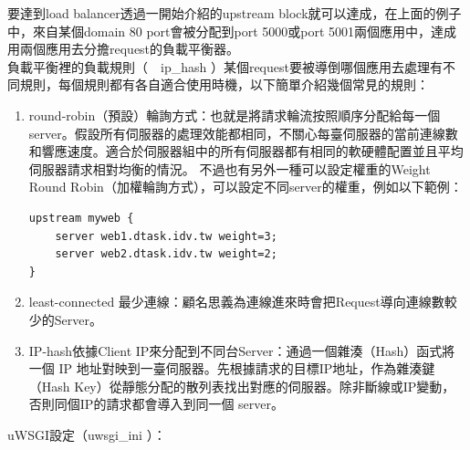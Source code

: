 \documentclass[14pt,a4paper]{report}  %
\begin{document}
 要達到load balancer透過一開始介紹的upstream block就可以達成，在上面的例子中，來自某個domain 80 port會被分配到port 5000或port 5001兩個應用中，達成用兩個應用去分擔request的負載平衡器。\\
 
 負載平衡裡的負載規則（　ip\_hash ）某個request要被導倒哪個應用去處理有不同規則，每個規則都有各自適合使用時機，以下簡單介紹幾個常見的規則：\\

\begin{enumerate}
\item round-robin（預設）輪詢方式：也就是將請求輪流按照順序分配給每一個 server。假設所有伺服器的處理效能都相同，不關心每臺伺服器的當前連線數和響應速度。適合於伺服器組中的所有伺服器都有相同的軟硬體配置並且平均伺服器請求相對均衡的情況。
不過也有另外一種可以設定權重的Weight Round Robin（加權輪詢方式），可以設定不同server的權重，例如以下範例：
\begin{lstlisting}[caption=設定不同 server 的權重]
  upstream myweb {
    server web1.dtask.idv.tw weight=3;
    server web2.dtask.idv.tw weight=2;
}
\end{lstlisting}
\item least-connected 最少連線：顧名思義為連線進來時會把Request導向連線數較少的Server。
\item IP-hash依據Client IP來分配到不同台Server：通過一個雜湊（Hash）函式將一個 IP 地址對映到一臺伺服器。先根據請求的目標IP地址，作為雜湊鍵（Hash Key）從靜態分配的散列表找出對應的伺服器。除非斷線或IP變動，否則同個IP的請求都會導入到同一個 server。
\end{enumerate}
  uWSGI設定（uwsgi\_ini ）：\\
\end{document}
